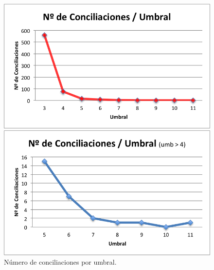 %
%

\begin{figure}
\centering

\begin{minipage}[b]{0.45\linewidth}
\includegraphics[scale=0.5]{img/7/est_nconciliaciones}
\end{minipage}
\hspace{0.3cm}
\begin{minipage}[b]{0.45\linewidth}
\includegraphics[scale=0.5]{img/7/est_nconciliaciones2}
\end{minipage}

\caption{Número de conciliaciones por umbral.
\label{fig:estNConc}}
\end{figure}

